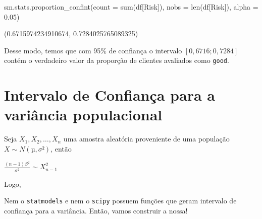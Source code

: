 \documentclass[
  letterpaper,
  DIV=11,
  numbers=noendperiod]{scrreprt}
\newenvironment{Shaded}{\begin{snugshade}}{\end{snugshade}}
\newcommand{\BuiltInTok}[1]{\textcolor[rgb]{0.00,0.23,0.31}{#1}}
\newcommand{\FloatTok}[1]{\textcolor[rgb]{0.68,0.00,0.00}{#1}}
\newcommand{\NormalTok}[1]{\textcolor[rgb]{0.00,0.23,0.31}{#1}}
\newcommand{\OperatorTok}[1]{\textcolor[rgb]{0.37,0.37,0.37}{#1}}
\newcommand{\StringTok}[1]{\textcolor[rgb]{0.13,0.47,0.30}{#1}}
\begin{document}
\begin{Shaded}
\begin{Highlighting}[]
\NormalTok{sm.stats.proportion\_confint(count }\OperatorTok{=} \BuiltInTok{sum}\NormalTok{(df[}\StringTok{\textquotesingle{}Risk\textquotesingle{}}\NormalTok{]), nobs }\OperatorTok{=} \BuiltInTok{len}\NormalTok{(df[}\StringTok{\textquotesingle{}Risk\textquotesingle{}}\NormalTok{]), alpha }\OperatorTok{=} \FloatTok{0.05}\NormalTok{)}
\end{Highlighting}
\end{Shaded}

\begin{tcolorbox}[enhanced jigsaw, breakable, leftrule=.75mm, left=2mm, opacityback=0, bottomrule=.15mm, toprule=.15mm, rightrule=.15mm, arc=.35mm, colback=white]

(0.6715974234910674, 0.7284025765089325)

\end{tcolorbox}

Desse modo, temos que com 95\% de confiança o intervalo
\({[0,6716; 0,7284]}\) contém o verdadeiro valor da proporção de
clientes avaliados como \texttt{good}.


\hypertarget{intervalo-de-confianuxe7a-para-a-variuxe2ncia-populacional}{%
\chapter{Intervalo de Confiança para a variância
populacional}\label{intervalo-de-confianuxe7a-para-a-variuxe2ncia-populacional}}

Seja \({X_{1}, X_{2}, …, X_{n}}\) uma amostra aleatória proveniente de
uma população \({X \sim N(µ, σ²)}\), então

\(\frac{(n - 1)S^{2}}{\sigma ^{2}} \sim X^{2}_{n-1}\)

Logo,

Nem o \texttt{statmodels} e nem o \texttt{scipy} possuem funções que
geram intervalo de confiança para a variância. Então, vamos construir a
nossa!
\end{document}
